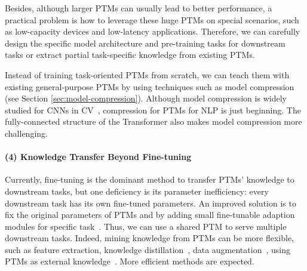 \documentclass[fleqn]{SCYE-arxiv}
\begin{document}
\begin{multicols}{2}
Besides, although larger PTMs can usually lead to better performance, a practical problem is how to leverage these huge PTMs on special scenarios, such as low-capacity devices and low-latency applications.
Therefore, we can carefully design the specific model architecture and pre-training tasks for downstream tasks or extract partial task-specific knowledge from existing PTMs.

Instead of training task-oriented PTMs from scratch, we can teach them with existing general-purpose PTMs by using techniques such as model compression (see Section \ref{sec:model-compression}). Although model compression is widely studied for CNNs in CV~\cite{cheng2017survey}, compression for PTMs for NLP is just beginning. The fully-connected structure of the Transformer also makes model compression more challenging.








\paragraph{(4) Knowledge Transfer Beyond Fine-tuning}

Currently, fine-tuning is the dominant method to transfer PTMs' knowledge to downstream tasks, but one deficiency is its parameter inefficiency: every downstream task has its own fine-tuned parameters. An improved solution is to fix the original parameters of PTMs and by adding small fine-tunable adaption modules for specific task~\cite{stickland2019bert,houlsby2019parameter}.
Thus, we can use a shared PTM to serve multiple downstream tasks.
Indeed, mining knowledge from PTMs can be more flexible, such as feature extraction, knowledge distillation~\cite{textbrewer}, data augmentation~\cite{wu2019conditional,kumar2020data}, using PTMs as external knowledge~\cite{petroni2019language}.
More efficient methods are expected.




\end{multicols}
\end{document}
